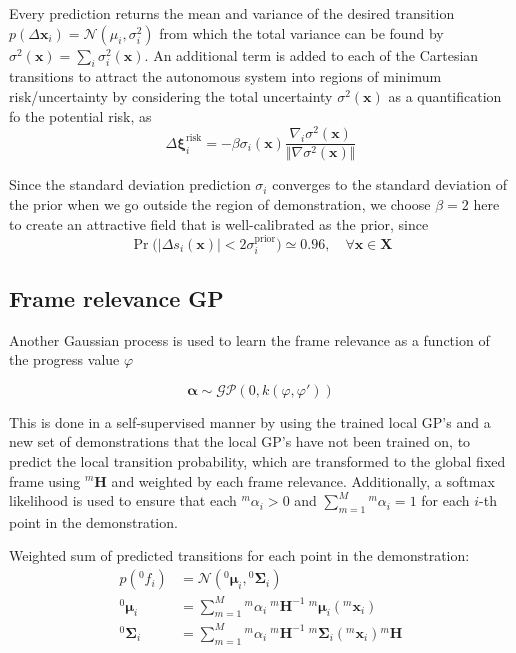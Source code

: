 Every prediction returns the mean and variance of the desired transition \( p(\Delta \boldsymbol{x}_i) = \mathcal{N}(\mu_i, \sigma_i^2) \) from which the total variance can be found by \( \sigma^2(\boldsymbol{x}) = \sum_{i} \sigma_i^2(\boldsymbol{x}) \).
An additional term is added to each of the Cartesian transitions to attract the autonomous system into regions of minimum risk/uncertainty by considering the total uncertainty \( \sigma^2(\boldsymbol{x}) \) as a quantification fo the potential risk, as
\begin{equation}
    \Delta \boldsymbol{\xi}_i^{\text{risk}} = - \beta \sigma_i(\boldsymbol{x}) \frac{\nabla_i \sigma^2(\boldsymbol{x})}{\Vert \nabla \sigma^2(\boldsymbol{x}) \Vert}
\end{equation}

Since the standard deviation prediction \( \sigma_i \) converges to the standard deviation of the prior when we go outside the region of demonstration, we choose \( \beta = 2 \) here to create an attractive field that is well-calibrated as the prior, since
\begin{equation}
    \Pr \Big( \big\vert \Delta s_i(\boldsymbol{x}) \big\vert < 2 \sigma_i^\text{prior} \Big) \simeq 0.96, \quad \forall \boldsymbol{x} \in \boldsymbol{X}
\end{equation}

\subsection{Frame relevance GP}\label{sec:frame-relevance-gp}

Another Gaussian process is used to learn the frame relevance as a function of the progress value \( \varphi \)

\begin{equation}
    \boldsymbol{\alpha} \sim \mathcal{GP}(0, k(\varphi, \varphi'))
\end{equation}

This is done in a self-supervised manner by using the trained local GP's and a new set of demonstrations that the local GP's have not been trained on, to predict the local transition probability, which are transformed to the global fixed frame using \( {}^{m}\boldsymbol{H} \) and weighted by each frame relevance.
Additionally, a softmax likelihood is used to ensure that each \( {}^{m}\alpha_i > 0 \) and \( \sum_{m=1}^M {}^{m}\alpha_i = 1 \) for each \( i \)-th point in the demonstration.

Weighted sum of predicted transitions for each point in the demonstration:
\begin{align}
    p \left( {}^{0}f_i \right)
     & =
    \mathcal{N} \left( {}^{0}\boldsymbol{\mu}_i, {}^{0}\boldsymbol{\Sigma}_i \right)
    \\
    {}^{0}\boldsymbol{\mu}_i
     & =
    \sum_{m = 1}^M {}^{m}\alpha_i \ {}^{m}\boldsymbol{H}^{-1} \ {}^{m}\boldsymbol{\mu}_i \left( {}^{m}\boldsymbol{x}_i \right)
    \\
    {}^{0}\boldsymbol{\Sigma}_i
     & =
    \sum_{m = 1}^M {}^{m}\alpha_i \ {}^{m}\boldsymbol{H}^{-1} \ {}^{m}\boldsymbol{\Sigma}_i \left( {}^{m}\boldsymbol{x}_i \right) {}^{m}\boldsymbol{H}
\end{align}

